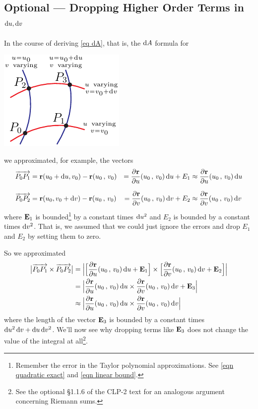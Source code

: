 \subsection{Optional --- Dropping Higher Order Terms in $\mathrm{d}u,\mathrm{d}v$}\label{sec:hoterms}
In the course of deriving \eqref{eq dA}, that is,
the $\mathrm{d}A$ formula for 
\begin{nfig}
\begin{center}
    \includegraphics{dA.pdf}
\end{center}
\end{nfig}
we approximated, for example, the vectors
\begin{alignat*}{3}
\overrightarrow{P_0P_1}
&=\vr(u_0+\dee{u}, v_0) -\vr(u_0\,,\,v_0) 
&= \pdiff{\vr}{u}(u_0\,,\,v_0)\,\dee{u} + E_1
&\approx \pdiff{\vr}{u}(u_0\,,\,v_0)\,\dee{u}  \\[0.1in]
\overrightarrow{P_0P_2}
&=\vr(u_0, v_0+\dee{v})-\vr(u_0\,,\,v_0) 
&= \pdiff{\vr}{v}(u_0\,,\,v_0)\,\dee{v}  + E_2
&\approx \pdiff{\vr}{v}(u_0\,,\,v_0)\,\dee{v}  
\end{alignat*}
where $\mathbf{E}_1$ is bounded\footnote{Remember the error in the Taylor polynomial 
approximations. See \eqref{eqn quadratic exact} and
\eqref{eqn linear bound}.} by a constant times $\mathrm{d}u^2$
and $E_2$ is bounded by a constant times $\mathrm{d}v^2$. That is, we assumed 
that we could just ignore the errors and drop $E_1$ and $E_2$ by setting them
to zero. 

So we approximated
\begin{align*}
\big|\overrightarrow{P_0P_1}\times\overrightarrow{P_0P_2}\big|
&=\Big|\Big[\pdiff{\vr}{u}(u_0\,,\,v_0)\,\dee{u} + \vE_1\Big]
\times\Big[\pdiff{\vr}{v}(u_0\,,\,v_0)\,\dee{v} + \vE_2\Big]
\Big| \\
&=\Big|\pdiff{\vr}{u}(u_0\,,\,v_0)\,\dee{u} 
\times\pdiff{\vr}{v}(u_0\,,\,v_0)\,\dee{v} + \vE_3
\Big| \\
&\approx \Big|\pdiff{\vr}{u}(u_0\,,\,v_0)\,\dee{u} 
\times\pdiff{\vr}{v}(u_0\,,\,v_0)\,\dee{v}
\Big|
\end{align*}
where the length of the vector $\mathbf{E}_3$ is bounded by a constant times 
$\mathrm{d}u^2\,\mathrm{d}v+\mathrm{d}u\,\mathrm{d}v^2$.
We'll now see why dropping terms like $\mathbf{E}_3$ does not change the value
of the integral at all\footnote{See the optional \S 1.1.6 of the CLP-2 text
for an analogous argument concerning Riemann sums.}. 

